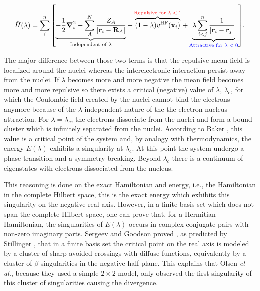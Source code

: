 \documentclass[11pt,a4paper]{article}
\newcommand{\hH}{\Hat{H}}
\begin{document}
\begin{equation}\label{eq:HamiltonianStillinger}
    \hH(\lambda) = 
    \sum_{i}^{n} \qty[ 
    \underbrace{-\frac{1}{2}\grad_i^2 
    - \sum_{A}^{N} \frac{Z_A}{\abs{\vb{r}_i-\vb{R}_A}}}_{\text{Independent of $\lambda$}}
    + \overbrace{(1-\lambda)v^{\text{HF}}(\vb{x}_i)}^{\textcolor{red}{\text{Repulsive for $\lambda < 1$}}}
    + \underbrace{\lambda\sum_{i<j}^{n}\frac{1}{|\vb{r}_i-\vb{r}_j|}}_{\textcolor{blue}{\text{Attractive for $\lambda < 0$}}} 
    ].
\end{equation}

The major difference between those two terms is that the repulsive mean field is localized around the nuclei whereas the interelectronic interaction persist away from the nuclei. If $\lambda$ becomes more and more negative the mean field becomes more and more repulsive so there exists a critical (negative) value of $\lambda$, $\lambda_\text{c}$, for which the Coulombic field created by the nuclei cannot bind the electrons anymore because of the $\lambda$-independent nature of the the electron-nucleus attraction. For $\lambda = \lambda_c$, the electrons dissociate from the nuclei and form a bound cluster which is infinitely separated from the nuclei. According to Baker \cite{Baker_1971}, this value is a critical point of the system and, by analogy with thermodynamics, the energy $E(\lambda)$ exhibits a singularity at $\lambda_\text{c}$. At this point the system undergo a phase transition and a symmetry breaking. Beyond $\lambda_c$ there is a continuum of eigenstates with electrons dissociated from the nucleus.

This reasoning is done on the exact Hamiltonian and energy, i.e., the Hamiltonian in the complete Hilbert space, this is the exact energy which exhibits this singularity on the negative real axis. However, in a finite basis set which does not span the complete Hilbert space, one can prove that, for a Hermitian Hamiltonian, the singularities of $E(\lambda)$ occurs in complex conjugate pairs with non-zero imaginary parts. Sergeev and Goodson proved \cite{Sergeev_2005}, as predicted by Stillinger \cite{Stillinger_2000}, that in a finite basis set the critical point on the real axis is modeled by a cluster of sharp avoided crossings with diffuse functions, equivalently by a cluster of $\beta$ singularities in the negative half plane. This explains that Olsen \textit{et al.}, because they used a simple $2\times2$ model, only observed the first singularity of this cluster of singularities causing the divergence.
\end{document}
